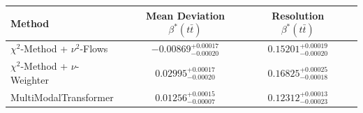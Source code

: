     \begin{tabular}{lccc}
        \toprule
        Method & Mean Deviation $\beta^*(t\bar{t})$ & Resolution $\beta^*(t\bar{t})$ \\
        \midrule
        $\chi^2$-Method + $\nu^2$-Flows & $-0.00869^{+0.00017}_{-0.00020}$ & $0.15201^{+0.00019}_{-0.00020}$ \\
        $\chi^2$-Method + $\nu$-Weighter & $0.02995^{+0.00017}_{-0.00020}$ & $0.16825^{+0.00025}_{-0.00018}$ \\
        MultiModalTransformer & $0.01256^{+0.00015}_{-0.00007}$ & $0.12312^{+0.00013}_{-0.00023}$ \\
        \bottomrule
    \end{tabular}